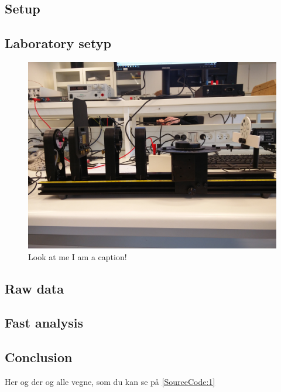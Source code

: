 \documentclass[a4paper, oneside, onecolumn, 11pt]{memoir}
\newenvironment{code}{\captionsetup{type=listing}}{}
\begin{document}
\subsection{Setup}

\subsection{Laboratory setyp}
\begin{figure}[h]
    \centering
    \includegraphics[width=\textwidth]{setup}
    \caption{Look at me I am a caption!}
\end{figure}

\subsection{Raw data}


\subsection{Fast analysis}

\subsection{Conclusion}
Her og der og alle vegne, som du kan se på \cref{SourceCode:1}

\begin{code}
	\caption{Caption
    \label{SourceCode:1}}
    \inputminted[firstline=1, lastline=5, frame=single, framesep=2mm, fontsize=\footnotesize, linenos%
]{python}{kode.py}
\end{code}
\end{document}
